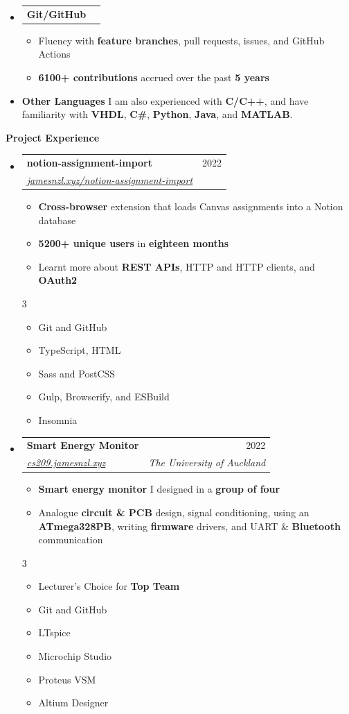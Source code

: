 \documentclass[11pt,a4paper]{article}[leftmargin=*]
\makeatletter
\def \entryspacing {-0pt}
\def \bulletstylei {\faAngleRight\hspace{-4.5pt}}
\def \bulletstyleii {\faCaretRight\hspace{-4.5pt}}
\renewcommand{\section}[2]{\vspace{5pt}
  \colorbox{secondary}{\color{white}\raggedbottom\normalsize\textbf{{#1}{\hspace{2pt}#2\hspace{4pt}}}}
}
\newcommand{\resumeEntryStart}{\begin{itemize}[leftmargin=2.5mm]}
\newcommand{\resumeEntryEnd}{\end{itemize}\vspace{\entryspacing}}
\newcommand{\resumeItemListStart}{\begin{itemize}[leftmargin=4.5mm]}
\newcommand{\resumeItemListEnd}{\end{itemize}}
\newcommand{\resumeItemListStartColumns}[2][-0.5]{\vspace*{#1\multicolsep}
\begin{multicols}{#2}\begin{itemize}[leftmargin=4.5mm]}
\newcommand{\resumeItemListEndColumns}[1][-1]{\end{itemize}\end{multicols}\vspace*{#1\multicolsep}}
\newcommand{\resumeItem}[2][\bulletstylei]{
  \item[\small#1]\small{
    {#2 \vspace{-2pt}}
  }
}
\newcommand{\resumeEntryTSDL}[4]{
  \vspace{-1pt}\item[]
    \begin{tabularx}{0.97\textwidth}{X@{\hspace{60pt}}r}
      \textbf{\color{primary}#1} & {\firabook\color{accent}\small#2} \\
      \textit{\color{accent}\small#3} & \textit{\color{accent}\small#4} \\
    \end{tabularx}\vspace{-6pt}
}
\newcommand{\resumeEntryTD}[2]{
  \vspace{-1pt}\item[]
    \begin{tabularx}{0.97\textwidth}{X@{\hspace{60pt}}r}
      \textbf{\color{primary}#1} & {\firabook\color{accent}\small#2} \\
    \end{tabularx}\vspace{-6pt}
}
\newcommand{\resumeEntryS}[2]{
  \item[]\small{
    \textbf{\color{primary}#1 }{ #2 \vspace{-4pt}}
  }
}
\newcommand{\resumeBf}[1]{\small\textbf{\color{halfbold}#1}}
\makeatother
\begin{document}
\resumeEntryStart
\resumeEntryTD
{Git/GitHub}{}
\resumeItemListStart
\resumeItem {Fluency with \resumeBf{feature branches}, pull requests, issues, and GitHub Actions}
\resumeItem {\resumeBf{6100+ contributions} accrued over the past \resumeBf{5 years}}
\resumeItemListEnd
\resumeEntryEnd

\resumeEntryStart
\resumeEntryS
{Other Languages}{I am also experienced with \resumeBf{C/C++}, and have familiarity with \resumeBf{VHDL}, \resumeBf{C\#}, \resumeBf{Python}, \resumeBf{Java}, and \resumeBf{MATLAB}.}
\resumeEntryEnd

\pagebreak


\section{\faFlask}{Project Experience}

\resumeEntryStart
\resumeEntryTSDL
{notion-assignment-import}{2022}
{\href{https://jamesnzl.xyz/notion-assignment-import}{jamesnzl.xyz/notion-assignment-import}}{}
\resumeItemListStart
\resumeItem {\resumeBf{Cross-browser} extension that loads Canvas assignments into a Notion database}
\resumeItem {\resumeBf{5200+ unique users} in \resumeBf{eighteen months}}
\resumeItem {Learnt more about \resumeBf{REST APIs}, HTTP and HTTP clients, and \resumeBf{OAuth2}}
\resumeItemListEnd
\resumeItemListStartColumns{3}
\resumeItem[\bulletstyleii] {Git and GitHub}
\resumeItem[\bulletstyleii] {TypeScript, HTML}
\resumeItem[\bulletstyleii] {Sass and PostCSS}
\resumeItem[\bulletstyleii] {Gulp, Browserify, and ESBuild}
\resumeItem[\bulletstyleii] {Insomnia}
\resumeItemListEndColumns
\resumeEntryEnd

\resumeEntryStart
\resumeEntryTSDL
{Smart Energy Monitor}{2022}
{\href{https://cs209.jamesnzl.xyz}{cs209.jamesnzl.xyz}}{The University of Auckland}
\resumeItemListStart
\resumeItem {\resumeBf{Smart energy monitor} I designed in a \resumeBf{group of four}}
\resumeItem {Analogue \resumeBf{circuit \& PCB} design, signal conditioning, using an \resumeBf{ATmega328PB}, writing \resumeBf{firmware} drivers, and UART \& \resumeBf{Bluetooth} communication}
\resumeItemListEnd
\resumeItemListStartColumns{3}
\resumeItem[\bulletstyleii] {Lecturer's Choice for \resumeBf{Top Team}}
\resumeItem[\bulletstyleii] {Git and GitHub}
\resumeItem[\bulletstyleii] {LTspice}
\resumeItem[\bulletstyleii] {Microchip Studio}
\resumeItem[\bulletstyleii] {Proteus VSM}
\resumeItem[\bulletstyleii] {Altium Designer}
\resumeItemListEndColumns
\resumeEntryEnd
\end{document}
